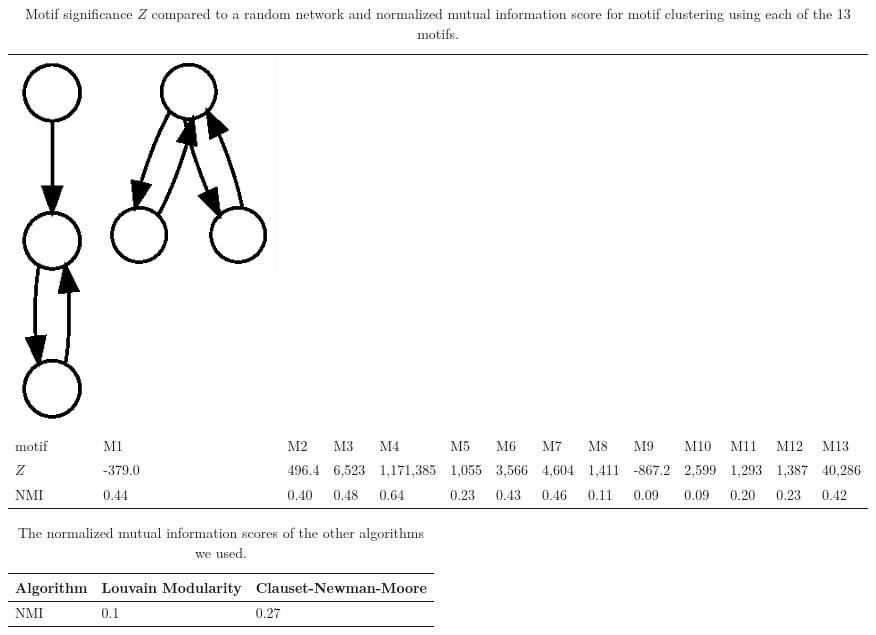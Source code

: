 \begin{table}[t!]
\begin{tabular}{l|lllllllllllll}
    \includegraphics[height=0.03\textheight]{M12-plain} &
    \includegraphics[height=0.03\textheight]{M13-plain} \\
    motif & M1 & M2 & M3 & M4 & M5 & M6 & M7 & M8 & M9 & M10 & M11 & M12 & M13
    \\ \hline
    $Z$ & -379.0 & 496.4 & 6,523 & 1,171,385 & 1,055 & 3,566 & 4,604 & 1,411 &
    -867.2 & 2,599 & 1,293 & 1,387 & 40,286 \\
    NMI & 0.44 & 0.40 & 0.48 & 0.64 & 0.23 & 0.43 & 0.46 & 0.11 & 0.09 & 0.09 &
    0.20 & 0.23 & 0.42
  \end{tabular}
  \caption{Motif significance $Z$ compared to a random network and normalized
    mutual information score for motif clustering using each of the 13 motifs.}
  \label{tab:motifs}
\end{table}

\begin{table}[t!]
  \centering
  \begin{tabular}{l|ll}
    Algorithm & Louvain Modularity & Clauset-Newman-Moore \\ \hline
    NMI & 0.1 & 0.27
  \end{tabular}
  \caption{The normalized mutual information scores of the other algorithms we
    used.}
  \label{tab:others}
\end{table}

